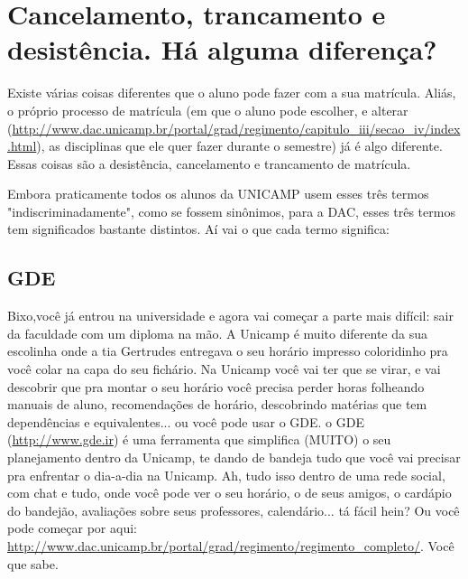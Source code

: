 \section{Cancelamento, trancamento e desistência. Há alguma diferença?}

Existe várias coisas diferentes que o aluno pode fazer com a sua matrícula.
Aliás, o próprio processo de matrícula (em que o aluno pode escolher, e alterar
(\url{http://www.dac.unicamp.br/portal/grad/regimento/capitulo_iii/secao_iv/index.html}),
as disciplinas que ele quer fazer durante o semestre) já é algo diferente. Essas
coisas são a desistência, cancelamento e trancamento de matrícula.

Embora praticamente todos os alunos da UNICAMP usem esses três termos
"indiscriminadamente", como se fossem sinônimos, para a DAC, esses três termos
tem significados bastante distintos. Aí vai o que cada termo significa:

\subsection{GDE}

Bixo,você já entrou na universidade e agora vai começar a parte mais difícil:
sair da faculdade com um diploma na mão.  A Unicamp é muito diferente da sua
escolinha onde a tia Gertrudes entregava o seu horário impresso coloridinho pra
você colar na capa do seu fichário. Na Unicamp você vai ter que se virar, e vai
descobrir que pra montar o seu horário você precisa perder horas folheando
manuais de aluno, recomendações de horário, descobrindo matérias que tem
dependências e equivalentes... ou você pode usar o GDE.  o GDE
(\url{http://www.gde.ir}) é uma ferramenta que simplifica (MUITO) o seu
planejamento dentro da Unicamp, te dando de bandeja tudo que você vai precisar
pra enfrentar o dia-a-dia na Unicamp.  Ah, tudo isso dentro de uma rede social,
com chat e tudo, onde você pode ver o seu horário, o de seus amigos, o cardápio
do bandejão, avaliações sobre seus professores, calendário... tá fácil hein?  Ou
você pode começar por aqui:
\url{http://www.dac.unicamp.br/portal/grad/regimento/regimento_completo/}. Você
que sabe.

